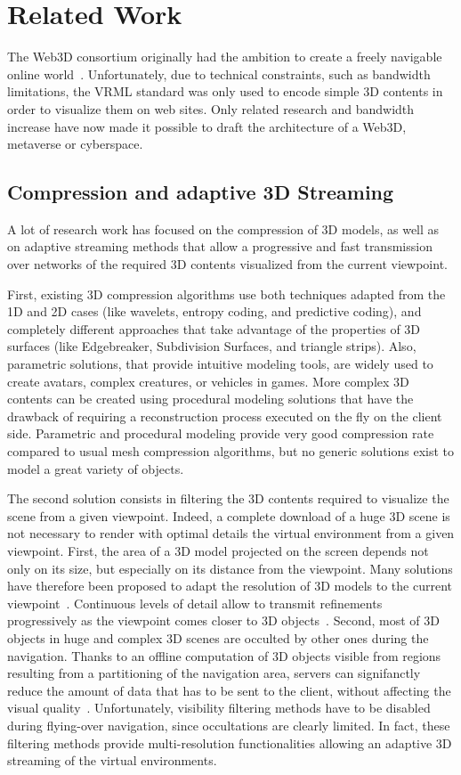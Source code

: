\section{Related Work}
\label{sec:relwk}
The Web3D consortium originally had the ambition to create a freely
navigable online world~\cite{pesce}. Unfortunately, due to technical
constraints, such as bandwidth limitations, the VRML standard was only
used to encode simple 3D contents in order to visualize them on web
sites. Only related research and bandwidth increase have now made it
possible to draft the architecture of a Web3D, metaverse or
cyberspace. 
\subsection{Compression and adaptive 3D Streaming}
A lot of research work has focused on the compression of 3D models, as
well as on adaptive streaming methods that allow a progressive and
fast transmission over networks of the required 3D contents visualized
from the current viewpoint.

First, existing 3D compression algorithms use both techniques adapted
from the 1D and 2D cases (like wavelets, entropy coding, and
predictive coding), and completely different approaches that take
advantage of the properties of 3D surfaces (like Edgebreaker,
Subdivision Surfaces, and triangle
strips)\cite{gioia}. Also, parametric solutions, that
provide intuitive modeling tools, are widely used to create avatars,
complex creatures, or vehicles in games. More complex 3D contents can
be created using procedural modeling solutions that have the
drawback of requiring a reconstruction process executed on the fly on
the client side. Parametric and procedural modeling provide very good
compression rate compared to usual mesh compression algorithms, but no
generic solutions exist to model a great variety of objects.

The second solution consists in filtering the 3D contents required to
visualize the scene from a given viewpoint. Indeed, a complete
download of a huge 3D scene is not necessary to render with optimal
details the virtual environment from a given viewpoint. First, the
area of a 3D model projected on the screen depends not only on its
size, but especially on its distance from the viewpoint. Many solutions
have therefore been proposed to adapt the resolution of 3D models to
the current viewpoint~\cite{Funkhouser}. Continuous levels of detail
allow to transmit refinements progressively as the viewpoint comes
closer to 3D objects~\cite{Hoppe}. Second, most of 3D objects
in huge and complex 3D scenes are occulted by other ones during the
navigation. Thanks to an offline computation of 3D objects visible
from regions resulting from a partitioning of the navigation area,
servers can signifanctly reduce the amount of data that has to be sent
to the client, without affecting the visual
quality~\cite{teller}. Unfortunately, visibility filtering
methods have to be disabled during flying-over navigation, since
occultations are clearly limited. In fact, these filtering methods
provide multi-resolution functionalities allowing an adaptive 3D
streaming of the virtual environments.

